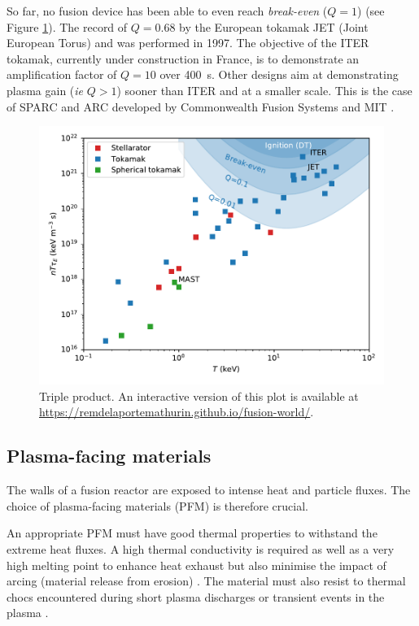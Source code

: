 So far, no fusion device has been able to even reach \textit{break-even} ($Q = 1$) (see Figure \ref{fig: triple product vs T}).
The record of $Q = 0.68$ by the European tokamak JET (Joint European Torus) and was performed in 1997.
The objective of the ITER tokamak, currently under construction in France, is to demonstrate an amplification factor of $Q=10$ over \SI{400}{s}. 
Other designs aim at demonstrating plasma gain (\textit{ie} $Q > 1$) sooner than ITER and at a smaller scale.
This is the case of SPARC and ARC developed by Commonwealth Fusion Systems and MIT .

\begin{figure}
    \centering
    \includegraphics[width=\linewidth]{Figures/Chapter1/triple_product_vs_T.pdf}
    \caption{Triple product. An interactive version of this plot is available at \href{https://remdelaportemathurin.github.io/fusion-world/}{https://remdelaportemathurin.github.io/fusion-world/}.}
    \label{fig: triple product vs T}
\end{figure}

\subsection{Plasma-facing materials}

The walls of a fusion reactor are exposed to intense heat and particle fluxes.
The choice of plasma-facing materials (PFM) is therefore crucial.

An appropriate PFM must have good thermal properties to withstand the extreme heat fluxes.
A high thermal conductivity is required as well as a very high melting point to enhance heat exhaust but also minimise the impact of arcing (material release from erosion) .
The material must also resist to thermal chocs encountered during short plasma discharges or transient events in the plasma .

